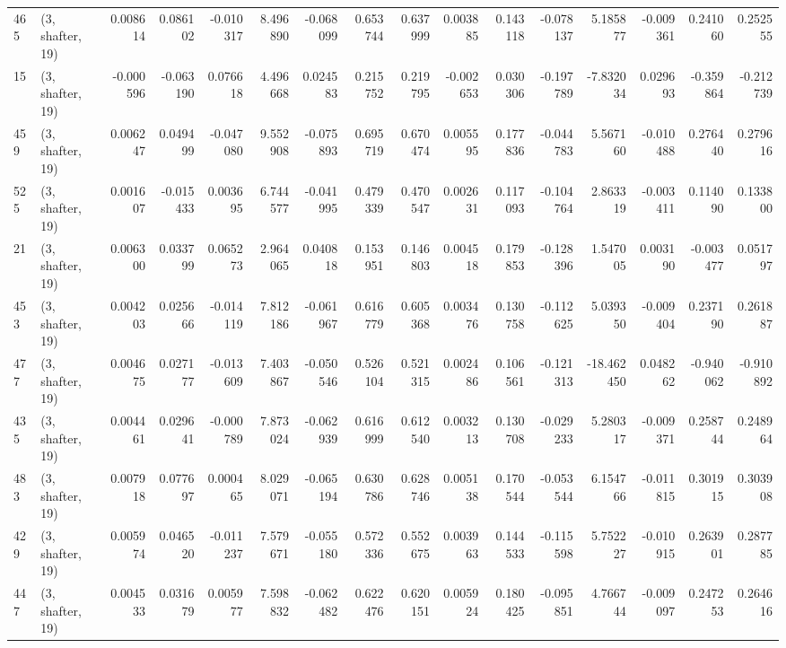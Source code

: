 \begin{tabular}{llrrrrrrrrrrrrrr}
465 &  (3, shafter, 19) &   0.008614 &  0.086102 & -0.010317 &    8.496890 & -0.068099 &   0.653744 &   0.637999 &  0.003885 &  0.143118 & -0.078137 &    5.185877 & -0.009361 &   0.241060 &   0.252555 \\
15  &  (3, shafter, 19) &  -0.000596 & -0.063190 &  0.076618 &    4.496668 &  0.024583 &   0.215752 &   0.219795 & -0.002653 &  0.030306 & -0.197789 &   -7.832034 &  0.029693 &  -0.359864 &  -0.212739 \\
459 &  (3, shafter, 19) &   0.006247 &  0.049499 & -0.047080 &    9.552908 & -0.075893 &   0.695719 &   0.670474 &  0.005595 &  0.177836 & -0.044783 &    5.567160 & -0.010488 &   0.276440 &   0.279616 \\
525 &  (3, shafter, 19) &   0.001607 & -0.015433 &  0.003695 &    6.744577 & -0.041995 &   0.479339 &   0.470547 &  0.002631 &  0.117093 & -0.104764 &    2.863319 & -0.003411 &   0.114090 &   0.133800 \\
21  &  (3, shafter, 19) &   0.006300 &  0.033799 &  0.065273 &    2.964065 &  0.040818 &   0.153951 &   0.146803 &  0.004518 &  0.179853 & -0.128396 &    1.547005 &  0.003190 &  -0.003477 &   0.051797 \\
453 &  (3, shafter, 19) &   0.004203 &  0.025666 & -0.014119 &    7.812186 & -0.061967 &   0.616779 &   0.605368 &  0.003476 &  0.130758 & -0.112625 &    5.039350 & -0.009404 &   0.237190 &   0.261887 \\
477 &  (3, shafter, 19) &   0.004675 &  0.027177 & -0.013609 &    7.403867 & -0.050546 &   0.526104 &   0.521315 &  0.002486 &  0.106561 & -0.121313 &  -18.462450 &  0.048262 &  -0.940062 &  -0.910892 \\
435 &  (3, shafter, 19) &   0.004461 &  0.029641 & -0.000789 &    7.873024 & -0.062939 &   0.616999 &   0.612540 &  0.003213 &  0.130708 & -0.029233 &    5.280317 & -0.009371 &   0.258744 &   0.248964 \\
483 &  (3, shafter, 19) &   0.007918 &  0.077697 &  0.000465 &    8.029071 & -0.065194 &   0.630786 &   0.628746 &  0.005138 &  0.170544 & -0.053544 &    6.154766 & -0.011815 &   0.301915 &   0.303908 \\
429 &  (3, shafter, 19) &   0.005974 &  0.046520 & -0.011237 &    7.579671 & -0.055180 &   0.572336 &   0.552675 &  0.003963 &  0.144533 & -0.115598 &    5.752227 & -0.010915 &   0.263901 &   0.287785 \\
447 &  (3, shafter, 19) &   0.004533 &  0.031679 &  0.005977 &    7.598832 & -0.062482 &   0.622476 &   0.620151 &  0.005924 &  0.180425 & -0.095851 &    4.766744 & -0.009097 &   0.247253 &   0.264616 \\

\end{tabular}
